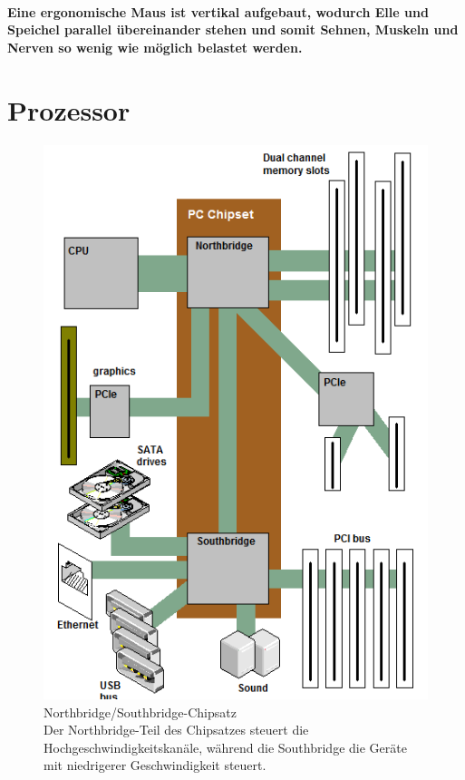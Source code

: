 \documentclass[a4paper]{article}
\begin{document}
    \paragraph{\color{codegreen} Eine \color{red}ergonomische Maus \color{codegreen} ist vertikal aufgebaut, wodurch Elle und Speichel parallel übereinander stehen und somit Sehnen, Muskeln und Nerven so wenig wie möglich belastet werden.}

    \section{Prozessor}\label{sec:prozessor}
    \begin{figure}
        \centering
        \includegraphics[scale=.2]{media/sb-nb}
        \captionsetup{labelformat=empty}
        \caption{Northbridge/Southbridge-Chipsatz\\\color{red}\small{Der Northbridge-Teil des Chipsatzes steuert die Hochgeschwindigkeitskanäle, während die Southbridge die Geräte mit niedrigerer Geschwindigkeit steuert.}}
        \label{fig:bridges}
    \end{figure}
\end{document}
